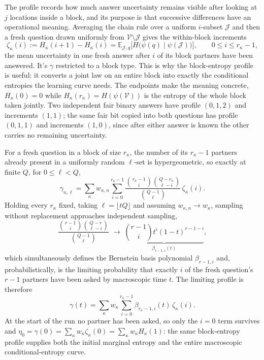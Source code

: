 \documentclass[11pt]{article}
\begin{document}
The profile records how much answer uncertainty remains visible after
looking at $j$ locations inside a block, and its purpose is that
successive differences have an operational meaning. Averaging the
chain rule over a uniform $i$-subset $\mathcal J$ and then a fresh
question drawn uniformly from $\mathcal V\setminus\mathcal J$ gives
the within-block increments
%
\begin{equation}
  \zeta_\kappa(i) := H_\kappa(i+1)-H_\kappa(i)
  = \mathbb E_{\mathcal J, q}
  \big[H\big(\psi(q)\mid\psi(\mathcal J)\big)\big],
  \qquad 0 \le i \le r_\kappa - 1,
  \label{eq:zetakappa}
\end{equation}
%
the mean uncertainty in one fresh answer after $i$ of its block
partners have been answered. It's $\gamma$ restricted to a block type. 
This is why the block-entropy profile is
useful: it converts a joint law on an entire block into exactly the
conditional entropies the learning curve needs. The endpoints make
the meaning concrete, $H_\kappa(0) = 0$ while
$H_\kappa(r_\kappa) = H(\psi(\mathcal V))$ is the entropy of the
whole block taken jointly. Two independent fair binary answers have
profile $(0,1,2)$ and increments $(1,1)$; the same fair bit copied
into both questions has profile $(0,1,1)$ and increments $(1,0)$,
since after either answer is known the other carries no remaining
uncertainty.

For a fresh question in a block of size $r_\kappa$, the number of its
$r_\kappa - 1$ partners already present in a uniformly random
$\ell$-set is hypergeometric, so exactly at finite $Q$, for
$0 \le \ell < Q$,
%
\begin{equation}
  \gamma_{n,\ell}
  = \sum_\kappa w_{\kappa,n}\sum_{i=0}^{r_\kappa-1}
  \frac{\binom{r_\kappa-1}{i}\binom{Q-r_\kappa}{\ell-i}}
       {\binom{Q-1}{\ell}}\,\zeta_\kappa(i).
  \label{eq:blockfinitegamma}
\end{equation}
%
Holding every $r_\kappa$ fixed, taking $\ell = \lfloor tQ\rfloor$ and
assuming $w_{\kappa,n}\to w_\kappa$, sampling without replacement
approaches independent sampling,
%
\begin{equation}
  \frac{\binom{r-1}{i}\binom{Q-r}{\ell-i}}{\binom{Q-1}{\ell}}
  \;\longrightarrow\;
  \underbrace{\binom{r-1}{i}t^i(1-t)^{r-1-i}}_{\textstyle
    \beta_{r-1,i}(t)},
  \label{eq:hyptobin}
\end{equation}
%
which simultaneously defines the Bernstein basis polynomial
$\beta_{r-1,i}$ and, probabilistically, is the limiting probability
that exactly $i$ of the fresh question's $r-1$ partners have been
asked by macroscopic time $t$. The limiting profile is therefore
%
\begin{equation}
  \gamma(t)
  = \sum_\kappa w_\kappa\sum_{i=0}^{r_\kappa-1}
  \beta_{r_\kappa-1,i}(t)\,\zeta_\kappa(i). 
  \label{eq:bernsteinprofile}
\end{equation}
%
At the start of the run no partner has been asked, so only the
$i = 0$ term survives and
$\eta_0 = \gamma(0) = \sum_\kappa w_\kappa\zeta_\kappa(0)
= \sum_\kappa w_\kappa H_\kappa(1)$: the same block-entropy profile
supplies both the initial marginal entropy and the entire macroscopic
conditional-entropy curve.
\end{document}
